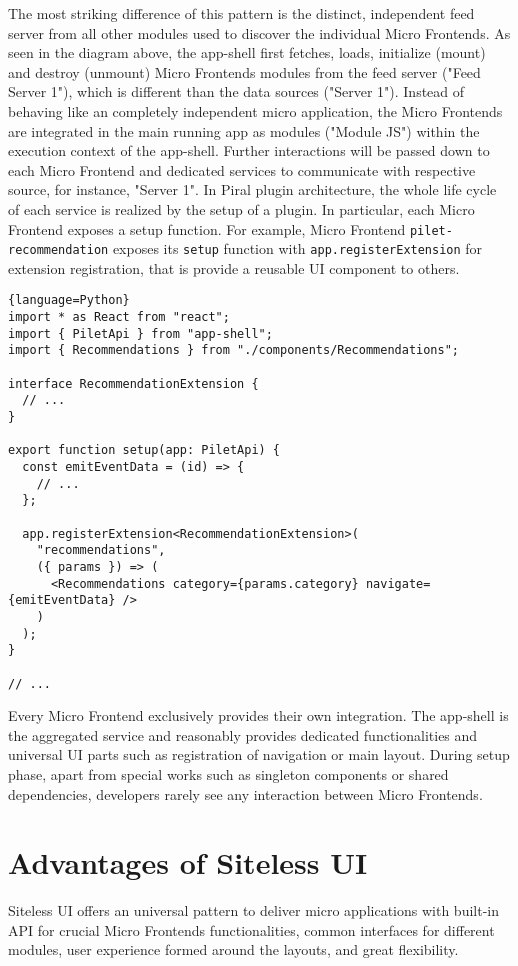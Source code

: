 \documentclass[a4paper]{book}
\begin{document}
The most striking difference of this pattern is the distinct, independent feed server from all other modules used to discover the individual Micro Frontends. As seen in the diagram above, the app-shell first fetches, loads, initialize (mount) and destroy (unmount) Micro Frontends modules from the feed server ("Feed Server 1"), which is different than the data sources ("Server 1"). Instead of behaving like an completely independent micro application, the Micro Frontends are integrated in the main running app as modules ("Module JS") within the execution context of the app-shell. Further interactions will be passed down to each Micro Frontend and dedicated services to communicate with respective source, for instance, "Server 1". In Piral plugin architecture, the whole life cycle of each service is realized by the setup of a plugin. In particular, each Micro Frontend exposes a setup function. For example, Micro Frontend \verb|pilet-recommendation| exposes its \verb|setup| function with \verb|app.registerExtension| for extension registration, that is provide a reusable UI component to others. \cite{Rap20}
\begin{lstlisting}{language=Python}
import * as React from "react";
import { PiletApi } from "app-shell";
import { Recommendations } from "./components/Recommendations";

interface RecommendationExtension {
  // ...
}

export function setup(app: PiletApi) {
  const emitEventData = (id) => {
    // ...
  };

  app.registerExtension<RecommendationExtension>(
    "recommendations",
    ({ params }) => (
      <Recommendations category={params.category} navigate={emitEventData} />
    )
  );
}

// ...
\end{lstlisting}
Every Micro Frontend exclusively provides their own integration. The app-shell is the aggregated service and reasonably provides dedicated functionalities and universal UI parts such as registration of navigation or main layout. During setup phase, apart from special works such as singleton components or shared dependencies, developers rarely see any interaction between Micro Frontends.
\section{Advantages  of Siteless UI}
Siteless UI offers an universal pattern to deliver micro applications with built-in API for crucial Micro Frontends functionalities, common interfaces for different modules, user experience formed around the layouts, and great flexibility.
\end{document}
